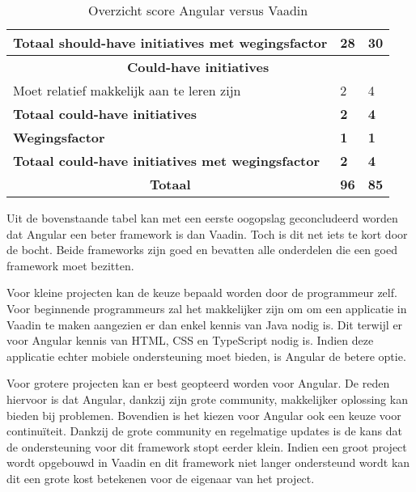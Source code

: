 \begin{table}[H]
\begin{tabular}{|l|l|l|}
		\textbf{Totaal should-have initiatives met wegingsfactor} & \textbf{28}      & \textbf{30}     \\ \hline
		\multicolumn{3}{|c|}{\textbf{Could-have initiatives}}                                          \\ \hline
		Moet relatief makkelijk aan te leren zijn				  & 2                & 4               \\ \hline
		\textbf{Totaal could-have initiatives}                    & \textbf{2}       & \textbf{4}      \\ \hline
		\textbf{Wegingsfactor}                                    & \textbf{1}       & \textbf{1}      \\ \hline
		\textbf{Totaal could-have initiatives met wegingsfactor}  & \textbf{2}       & \textbf{4}      \\ \hline
		\multicolumn{1}{|c|}{\textbf{Totaal}}                     & \textbf{96}      & \textbf{85}     \\ \hline
	\end{tabular}
\caption{Overzicht score Angular versus Vaadin}
\label{table:conclusieTabel}
\end{table}

Uit de bovenstaande tabel kan met een eerste oogopslag geconcludeerd worden dat Angular een beter framework is dan Vaadin. Toch is dit net iets te kort door de bocht.
Beide frameworks  zijn goed en bevatten alle onderdelen die een goed framework moet bezitten.

Voor kleine projecten kan de keuze bepaald worden door de programmeur zelf. Voor beginnende programmeurs zal het makkelijker zijn om om een applicatie in Vaadin te maken aangezien er dan enkel kennis van Java nodig is. Dit terwijl er voor Angular kennis van HTML, CSS en TypeScript nodig is. Indien deze applicatie echter mobiele ondersteuning moet bieden, is Angular de betere optie.

Voor grotere projecten kan er best geopteerd worden voor Angular. De reden hiervoor is dat Angular, dankzij zijn grote community, makkelijker oplossing kan bieden bij problemen. Bovendien is het kiezen voor Angular ook een keuze voor continuïteit. Dankzij de grote community en regelmatige updates is de kans dat de ondersteuning voor dit framework stopt eerder klein. Indien een groot project wordt opgebouwd in Vaadin en dit framework niet langer ondersteund wordt kan dit een grote kost betekenen voor de eigenaar van het project. 
\\\\


